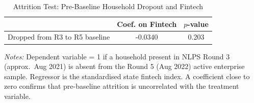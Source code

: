 \begin{table}[H]
\begin{threeparttable}
\caption{Attrition Test: Pre-Baseline Household Dropout and Fintech}
\label{atab:attrition}
\small\begin{tabular}{lcc}
\toprule
 & Coef. on Fintech & $p$-value \\
\midrule
Dropped from R3 to R5 baseline & -0.0340 & 0.203 \\
\bottomrule
\end{tabular}
\begin{tablenotes}\footnotesize
\item \textit{Notes:} Dependent variable = 1 if a household present in NLPS Round 3 (approx.\ Aug 2021) is absent from the Round 5 (Aug 2022) active enterprise sample. Regressor is the standardised state fintech index. A coefficient close to zero confirms that pre-baseline attrition is uncorrelated with the treatment variable.
\end{tablenotes}\end{threeparttable}\end{table}

